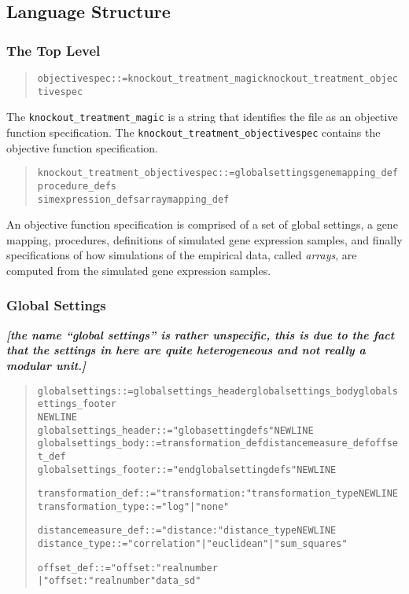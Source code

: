 \documentclass[a4paper,fleqn]{article}
\newcommand{\computercode}[1]{\texttt{#1}}
\newcommand{\newterm}[1]{\emph{#1}}
\newcommand{\todo}[1]{\rule{0pt}{0pt}\marginpar{\rule{1ex}{1ex}}\textbf{\emph{[#1]}}}
\newenvironment{ebnfrule}{\begin{footnotesize}\begin{quote}\begin{alltt}}{\end{alltt}\end{quote}\end{footnotesize}}
\begin{document}
\subsection{Language Structure}

\subsubsection{The Top Level}

\begin{ebnfrule}
objectivespec ::= knockout_treatment_magic knockout_treatment_objectivespec
\end{ebnfrule}
The \computercode{knockout\_treatment\_magic} is a string that
identifies the file as an objective function specification. The
\computercode{knockout\_treatment\_objectivespec} contains the
objective function specification.

\begin{ebnfrule}
knockout_treatment_objectivespec ::= globalsettings genemapping_def procedure_defs 
simexpression_defs arraymapping_def 
\end{ebnfrule}
An objective function specification is comprised of a set of global
settings, a gene mapping, procedures, definitions of simulated gene
expression samples, and finally specifications of how simulations of
the empirical data, called \newterm{arrays}, are computed from the
simulated gene expression samples.


\subsubsection{Global Settings}

\todo{the name ``global settings'' is rather unspecific, this is due
  to the fact that the settings in here are quite heterogeneous and
  not really a modular unit.}

\begin{ebnfrule}
globalsettings ::= globalsettings_header globalsettings_body globalsettings_footer
NEWLINE
globalsettings_header ::= "globasettingdefs" NEWLINE
globalsettings_body ::= transformation_def distancemeasure_def offset_def
globalsettings_footer ::= "endglobalsettingdefs" NEWLINE

transformation_def ::= "transformation:" transformation_type NEWLINE
transformation_type ::= "log" | "none"

distancemeasure_def ::= "distance:" distance_type NEWLINE
distance_type ::= "correlation" | "euclidean" | "sum_squares" 

offset_def ::= "offset:" realnumber
	| "offset:" realnumber "data_sd"
\end{ebnfrule}
\end{document}
